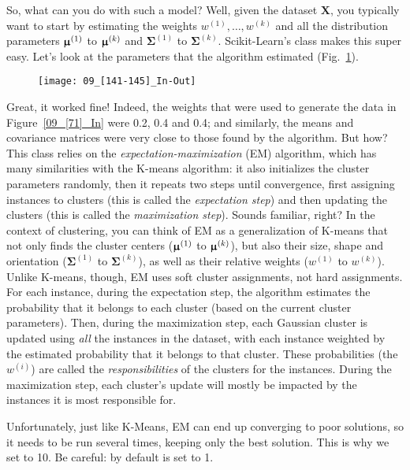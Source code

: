 So, what can you do with such a model? Well, given the dataset $\mathbf{X}$, you typically want to start by estimating the weights $w^{(1)},\ldots,w^{(k)}$ and all the distribution parameters $\boldsymbol{\upmu}^{(1)}$ to $\boldsymbol{\upmu}^{(k)}$ and $\boldsymbol{\Sigma}^{(1)}$ to $\boldsymbol{\Sigma}^{(k)}$. Scikit-Learn's  class makes this super easy. Let's look at the parameters that the algorithm estimated (Fig.~\ref{09_[141-145]_In-Out}).
\begin{figure}[h!t]
\centering
\texttt{[image: 09\_[141-145]\_In-Out]}
\caption{}\label{09_[141-145]_In-Out}
\end{figure}

Great, it worked fine! Indeed, the weights that were used to generate the data in Figure~\ref{09_[71]_In} were \num{0.2}, \num{0.4} and \num{0.4}; and similarly, the means and covariance matrices were very close to those found by the algorithm. But how? This class relies on the \emph{expectation-maximization} (EM) algorithm, which has many similarities with the K-means algorithm: it also initializes the cluster parameters randomly, then it repeats two steps until convergence, first assigning instances to clusters (this is called the \emph{expectation step}) and then updating the clusters (this is called the \emph{maximization step}). Sounds familiar, right? In the context of clustering, you can think of EM as a generalization of K-means that not only finds the cluster centers ($\boldsymbol{\upmu}^{(1)}$ to $\boldsymbol{\upmu}^{(k)}$), but also their size, shape and orientation ($\boldsymbol{\Sigma}^{(1)}$ to $\boldsymbol{\Sigma}^{(k)}$), as well as their relative weights ($w^{(1)}$ to $w^{(k)}$). Unlike K-means, though, EM uses soft cluster assignments, not hard assignments. For each instance, during the expectation step, the algorithm estimates the probability that it belongs to each cluster (based on the current cluster parameters). Then, during the maximization step, each Gaussian cluster is updated using \emph{all} the instances in the dataset, with each instance weighted by the estimated probability that it belongs to that cluster. These probabilities (the $w^{(i)}$) are called the \emph{responsibilities} of the clusters for the instances. During the maximization step, each cluster's update will mostly be impacted by the instances it is most responsible for.

Unfortunately, just like K-Means, EM can end up converging to poor solutions, so it needs to be run several times, keeping only the best solution. This is why we set  to 10. Be careful: by default  is set to 1.

